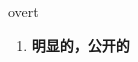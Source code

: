 
\begin{frame}
{\huge overt}
\begin{center}
\begin{enumerate}\Large
  \item \textbf{明显的，公开的}
\end{enumerate}
\end{center}
\end{frame}
